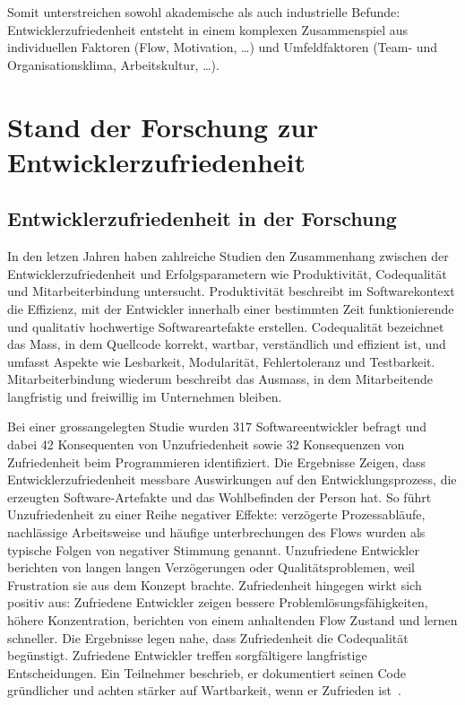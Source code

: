 \documentclass[12pt,a4paper]{report}
\begin{document}
Somit unterstreichen sowohl akademische als auch industrielle Befunde: Entwicklerzufriedenheit entsteht in einem komplexen
Zusammenspiel aus individuellen Faktoren (Flow, Motivation, \ldots) und Umfeldfaktoren (Team- und Organisationsklima, Arbeitskultur,
\ldots).

\section{Stand der Forschung zur Entwicklerzufriedenheit}

\subsection{Entwicklerzufriedenheit in der Forschung}

In den letzen Jahren haben zahlreiche Studien den Zusammenhang zwischen der Entwicklerzufriedenheit und Erfolgsparametern wie
Produktivität, Codequalität und Mitarbeiterbindung untersucht. Produktivität beschreibt im Softwarekontext die Effizienz, mit der
Entwickler innerhalb einer bestimmten Zeit funktionierende und qualitativ hochwertige Softwareartefakte erstellen. Codequalität
bezeichnet das Mass, in dem Quellcode korrekt, wartbar, verständlich und effizient ist, und umfasst Aspekte wie Lesbarkeit,
Modularität, Fehlertoleranz und Testbarkeit. Mitarbeiterbindung wiederum beschreibt das Ausmass, in dem Mitarbeitende langfristig
und freiwillig im Unternehmen bleiben.

Bei einer grossangelegten Studie wurden 317 Softwareentwickler befragt und dabei 42 Konsequenten von Unzufriedenheit sowie
32 Konsequenzen von Zufriedenheit beim Programmieren identifiziert. Die Ergebnisse Zeigen, dass Entwicklerzufriedenheit messbare
Auswirkungen auf den Entwicklungsprozess, die erzeugten Software-Artefakte und das Wohlbefinden der Person hat. So führt
Unzufriedenheit zu einer Reihe negativer Effekte: verzögerte Prozessabläufe, nachlässige Arbeitsweise und häufige unterbrechungen
des Flows wurden als typische Folgen von negativer Stimmung genannt. Unzufriedene Entwickler berichten von langen langen
Verzögerungen oder Qualitätsproblemen, weil Frustration sie aus dem Konzept brachte. Zufriedenheit hingegen wirkt sich positiv
aus: Zufriedene Entwickler zeigen bessere Problemlösungsfähigkeiten, höhere Konzentration, berichten von einem anhaltenden Flow
Zustand und lernen schneller. Die Ergebnisse legen nahe, dass Zufriedenheit die Codequalität begünstigt. Zufriedene Entwickler
treffen sorgfältigere langfristige Entscheidungen. Ein Teilnehmer beschrieb, er dokumentiert seinen Code gründlicher und achten
stärker auf Wartbarkeit, wenn er Zufrieden ist~\cite{graziotin_what_2018}.
\end{document}

